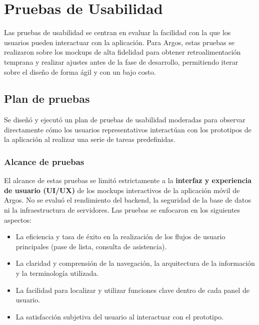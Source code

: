 \section{Pruebas de Usabilidad}

Las pruebas de usabilidad se centran en evaluar la facilidad con la que los usuarios pueden interactuar con la aplicación. Para Argos, estas pruebas se realizaron sobre los mockups de alta fidelidad para obtener retroalimentación temprana y realizar ajustes antes de la fase de desarrollo, permitiendo iterar sobre el diseño de forma ágil y con un bajo costo.

\subsection{Plan de pruebas}

Se diseñó y ejecutó un plan de pruebas de usabilidad moderadas para observar directamente cómo los usuarios representativos interactúan con los prototipos de la aplicación al realizar una serie de tareas predefinidas.

\subsubsection{Alcance de pruebas}
El alcance de estas pruebas se limitó estrictamente a la \textbf{interfaz y experiencia de usuario (UI/UX)} de los mockups interactivos de la aplicación móvil de Argos. No se evaluó el rendimiento del backend, la seguridad de la base de datos ni la infraestructura de servidores. Las pruebas se enfocaron en los siguientes aspectos:
\begin{itemize}
	\item La eficiencia y tasa de éxito en la realización de los flujos de usuario principales (pase de lista, consulta de asistencia).
	\item La claridad y comprensión de la navegación, la arquitectura de la información y la terminología utilizada.
	\item La facilidad para localizar y utilizar funciones clave dentro de cada panel de usuario.
	\item La satisfacción subjetiva del usuario al interactuar con el prototipo.
\end{itemize}

